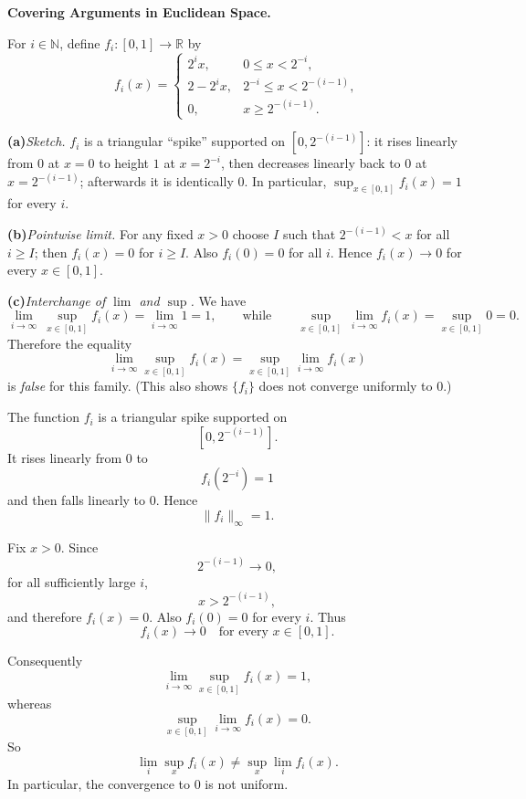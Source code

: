 \begin{problem}[CP-II-0531]
\label{prob:cp-ii-0531}
\textbf{Covering Arguments in Euclidean Space.}

\hspace*{1.5em}For $i\in\mathbb{N}$, define $f_i:[0,1]\to\mathbb{R}$ by
\[
f_i(x)=
\begin{cases}
2^i x, & 0\le x<2^{-i},\\[2pt]
2-2^i x, & 2^{-i}\le x<2^{-(i-1)},\\[2pt]
0, & x\ge 2^{-(i-1)}.
\end{cases}
\]

\renewcommand\labelenumi{(\alph{enumi})}
\par\smallskip\noindent\textbf{(a)}\quad \textit{Sketch.} $f_i$ is a triangular ``spike'' supported on $[0,2^{-(i-1)}]$: it rises linearly
from $0$ at $x=0$ to height $1$ at $x=2^{-i}$, then decreases linearly back to $0$ at $x=2^{-(i-1)}$; afterwards it is identically $0$.
In particular, $\displaystyle \sup_{x\in[0,1]} f_i(x)=1$ for every $i$.

\par\smallskip\noindent\textbf{(b)}\quad \textit{Pointwise limit.} For any fixed $x>0$ choose $I$ such that $2^{-(i-1)}<x$ for all $i\ge I$; then $f_i(x)=0$ for $i\ge I$.
Also $f_i(0)=0$ for all $i$. Hence $f_i(x)\to 0$ for every $x\in[0,1]$.

\par\smallskip\noindent\textbf{(c)}\quad \textit{Interchange of $\lim$ and $\sup$.} We have
\[
\lim_{i\to\infty}\ \sup_{x\in[0,1]} f_i(x)
= \lim_{i\to\infty} 1 = 1,
\qquad\text{while}\qquad
\sup_{x\in[0,1]} \ \lim_{i\to\infty} f_i(x) = \sup_{x\in[0,1]} 0 = 0.
\]
Therefore the equality
\[
\lim_{i\to\infty} \sup_{x\in[0,1]} f_i(x) = \sup_{x\in[0,1]} \lim_{i\to\infty} f_i(x)
\]
is \emph{false} for this family. (This also shows $\{f_i\}$ does not converge uniformly to $0$.)
\end{problem}

\begin{solution}
The function \(f_i\) is a triangular spike supported on
\[
[0,2^{-(i-1)}].
\]
It rises linearly from \(0\) to
\[
f_i(2^{-i})=1
\]
and then falls linearly to \(0\). Hence
\[
\boxed{\|f_i\|_\infty=1.}
\]

Fix \(x>0\). Since
\[
2^{-(i-1)}\to0,
\]
for all sufficiently large \(i\),
\[
x>2^{-(i-1)},
\]
and therefore \(f_i(x)=0\). Also \(f_i(0)=0\) for every \(i\). Thus
\[
\boxed{
f_i(x)\to0
\quad\text{for every }x\in[0,1].
}
\]

Consequently
\[
\lim_{i\to\infty}\sup_{x\in[0,1]}f_i(x)
=
1,
\]
whereas
\[
\sup_{x\in[0,1]}\lim_{i\to\infty}f_i(x)
=
0.
\]
So
\[
\boxed{
\lim_i\sup_x f_i(x)
\neq
\sup_x\lim_i f_i(x).
}
\]
In particular, the convergence to \(0\) is not uniform.
\end{solution}


